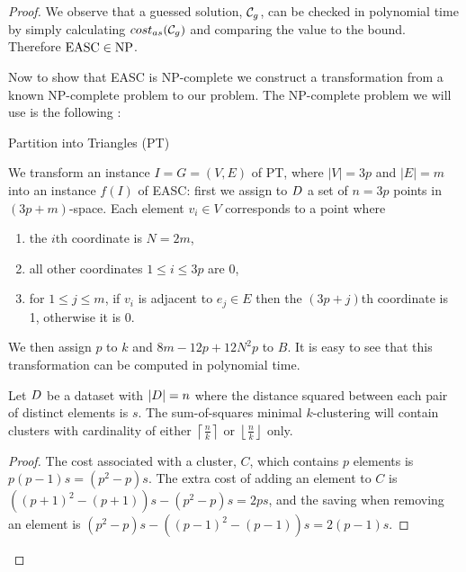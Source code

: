 \begin{proof}
  We observe that a guessed solution, $\mathcal{C}_g$, can be checked in polynomial
  time by simply calculating $cost_{as}(\mathcal{C}_g)$ and comparing the value to
  the bound.  Therefore $\text{EASC} \in \text{NP}$.
  
  Now to show that EASC is NP-complete we construct a transformation from a
  known NP-complete problem to our problem.  The NP-complete problem we will
  use is the following \citep{gareyjohnson79}:
  \begin{problem}{Partition into Triangles (PT)}
  \end{problem}

  We transform an instance $I = G = (V,E)$ of PT, where $|V|=3p$ and $|E|=m$
  into an instance $f(I)$ of EASC: first we assign to $D$ a set of $n=3p$
  points in $(3p+m)$-space.  Each element $v_i \in V$ corresponds to a point
  where
  \begin{enumerate}
  \item the $i$th coordinate is $N = 2m$,
  \item all other coordinates $1 \leq i \leq 3p$ are 0,
  \item for $1 \leq j \leq m$, if $v_i$ is adjacent to $e_j \in E$ then the
    $(3p+j)$th coordinate is 1, otherwise it is 0.
  \end{enumerate}
  We then assign $p$ to $k$ and $8m-12p+12N^2p$ to $B$.  It is easy to see
  that this transformation can be computed in polynomial time.

  \begin{lem}
    \label{lem:eq-dis}
    Let $D$ be a dataset with $|D| = n$ where the distance squared
    between each pair of distinct elements is $s$.  The sum-of-squares minimal
    $k$-clustering will contain clusters with cardinality of either
    $\left\lceil \frac{n}{k} \right\rceil$ or $\left\lfloor \frac{n}{k}
    \right\rfloor$ only.
  \end{lem}

  \begin{proof}
    The cost associated with a cluster, $C$, which contains $p$ elements is
    $p(p-1)s = (p^2-p)s$.  The extra cost of adding an element to $C$ is
    $((p+1)^2 - (p+1))s - (p^2-p)s = 2ps$, and the saving when removing an
    element is $(p^2 - p)s - ((p-1)^2 - (p-1))s = 2(p - 1)s$.


\end{proof}
\end{proof}
